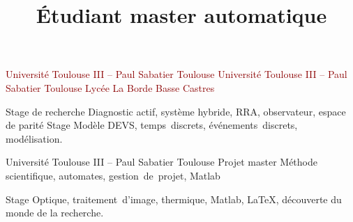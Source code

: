 \documentclass[11pt,a4paper,sans]{moderncv}        %
\title{\huge Étudiant master automatique} %
\begin{document}
\begin{samepage}
\makecvtitle
\vspace{-1.3cm}%
\noindent\begin{minipage}[t]{.44\textwidth}%
\vspace*{-3mm}%
{\textcolor{darkred}{Université Toulouse III -- Paul Sabatier}}
{\textcolor{darkred}{Toulouse}}%
%
{\textcolor{darkred}{Université Toulouse III -- Paul Sabatier}}
{\textcolor{darkred}{Toulouse}}%
%
{\textcolor{darkred}{Lycée La Borde Basse}}
{\textcolor{darkred}{Castres}}%
\end{minipage}\hfill%
\noindent\begin{minipage}[t]{.51\textwidth}
%
{Stage de recherche}
{Diagnostic actif, système hybride, RRA, observateur, espace de parité}
%
{Stage}%
{Modèle DEVS, temps~discrets, événements~discrets, modélisation.}


%
{Université Toulouse III -- Paul Sabatier}
{Toulouse}%
{Projet master}%
{Méthode scientifique, automates, gestion~de~projet, Matlab}

%
{Stage}%
{Optique, traitement~d’image, thermique, Matlab, \LaTeX, découverte du monde de la recherche.}


\end{minipage}
\end{samepage}
\end{document}
